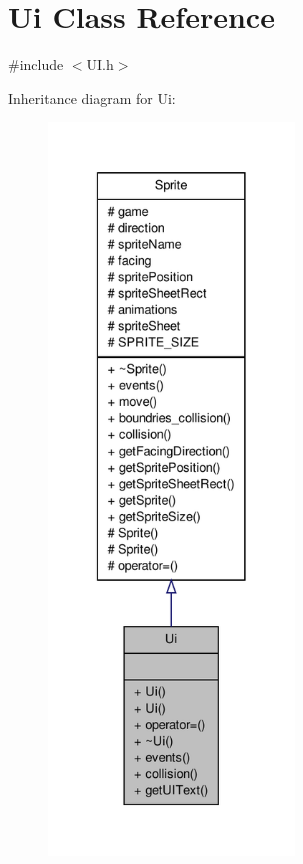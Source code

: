\hypertarget{classUi}{\section{Ui Class Reference}
\label{classUi}
}


{\ttfamily \#include $<$U\-I.\-h$>$}



Inheritance diagram for Ui\-:\nopagebreak
\begin{figure}[H]
\begin{center}
\leavevmode
\includegraphics[height=550pt]{classUi__inherit__graph}
\end{center}
\end{figure}


